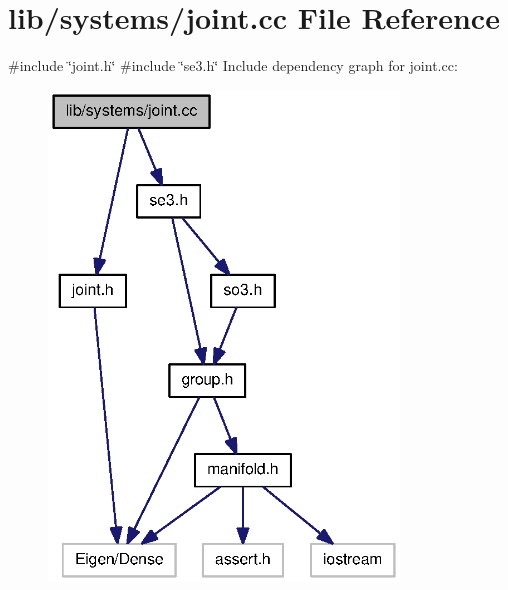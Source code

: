 \section{lib/systems/joint.cc \-File \-Reference}
\label{joint_8cc}
{\ttfamily \#include \char`\"{}joint.\-h\char`\"{}}\*
{\ttfamily \#include \char`\"{}se3.\-h\char`\"{}}\*
\-Include dependency graph for joint.\-cc\-:\nopagebreak
\begin{figure}[H]
\begin{center}
\leavevmode
\includegraphics[width=264pt]{joint_8cc__incl}
\end{center}
\end{figure}
